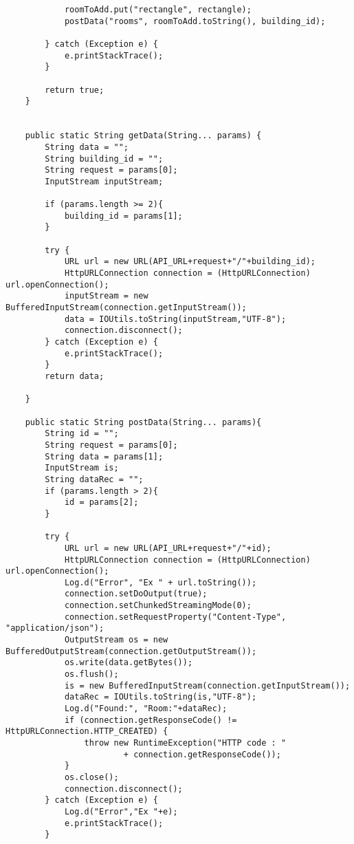 \begin{lstlisting}
            roomToAdd.put("rectangle", rectangle);
            postData("rooms", roomToAdd.toString(), building_id);

        } catch (Exception e) {
            e.printStackTrace();
        }

        return true;
    }


    public static String getData(String... params) {
        String data = "";
        String building_id = "";
        String request = params[0];
        InputStream inputStream;

        if (params.length >= 2){
            building_id = params[1];
        }

        try {
            URL url = new URL(API_URL+request+"/"+building_id);
            HttpURLConnection connection = (HttpURLConnection) url.openConnection();
            inputStream = new BufferedInputStream(connection.getInputStream());
            data = IOUtils.toString(inputStream,"UTF-8");
            connection.disconnect();
        } catch (Exception e) {
            e.printStackTrace();
        }
        return data;

    }

    public static String postData(String... params){
        String id = "";
        String request = params[0];
        String data = params[1];
        InputStream is;
        String dataRec = "";
        if (params.length > 2){
            id = params[2];
        }

        try {
            URL url = new URL(API_URL+request+"/"+id);
            HttpURLConnection connection = (HttpURLConnection) url.openConnection();
            Log.d("Error", "Ex " + url.toString());
            connection.setDoOutput(true);
            connection.setChunkedStreamingMode(0);
            connection.setRequestProperty("Content-Type", "application/json");
            OutputStream os = new BufferedOutputStream(connection.getOutputStream());
            os.write(data.getBytes());
            os.flush();
            is = new BufferedInputStream(connection.getInputStream());
            dataRec = IOUtils.toString(is,"UTF-8");
            Log.d("Found:", "Room:"+dataRec);
            if (connection.getResponseCode() != HttpURLConnection.HTTP_CREATED) {
                throw new RuntimeException("HTTP code : "
                        + connection.getResponseCode());
            }
            os.close();
            connection.disconnect();
        } catch (Exception e) {
            Log.d("Error","Ex "+e);
            e.printStackTrace();
        }


\end{lstlisting}
